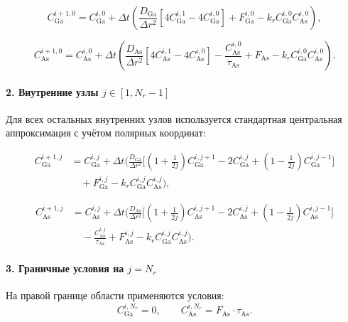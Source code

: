 \documentclass[14pt,oneside]{extarticle}
\begin{document}
\[
C_{\text{Ga}}^{i+1,0} = C_{\text{Ga}}^{i,0}
+ \Delta t \left(
\frac{D_{\text{Ga}}}{\Delta r^2} [4 C_{\text{Ga}}^{i,1} - 4 C_{\text{Ga}}^{i,0}]
+ F_{\text{Ga}}^{i,0}
- k_r C_{\text{Ga}}^{i,0} C_{\text{As}}^{i,0}
\right),
\]

\[
C_{\text{As}}^{i+1,0} = C_{\text{As}}^{i,0}
+ \Delta t \left(
\frac{D_{\text{As}}}{\Delta r^2} [4 C_{\text{As}}^{i,1} - 4 C_{\text{As}}^{i,0}]
- \frac{C_{\text{As}}^{i,0}}{\tau_{\text{As}}}
+ F_{\text{As}} - k_r C_{\text{Ga}}^{i,0} C_{\text{As}}^{i,0}
\right).
\]

\paragraph{2. Внутренние узлы \( j \in [1, N_r-1] \)}

Для всех остальных внутренних узлов используется стандартная центральная аппроксимация с учётом полярных координат:

\begin{align*}
    C_{\text{Ga}}^{i+1,j} &= C_{\text{Ga}}^{i,j}
    + \Delta t \Bigg(
      \frac{D_{\text{Ga}}}{\Delta r^2}
      \bigg[
        \left(1 + \frac{1}{2j} \right) C_{\text{Ga}}^{i,j+1}
        - 2 C_{\text{Ga}}^{i,j}
        + \left(1 - \frac{1}{2j} \right) C_{\text{Ga}}^{i,j-1}
      \bigg] \\
    &\quad + F_{\text{Ga}}^{i,j}
    - k_r C_{\text{Ga}}^{i,j} C_{\text{As}}^{i,j}
    \Bigg),
    \end{align*}
    
    \begin{align*}
    C_{\text{As}}^{i+1,j} &= C_{\text{As}}^{i,j}
    + \Delta t \Bigg(
      \frac{D_{\text{As}}}{\Delta r^2}
      \bigg[
        \left(1 + \frac{1}{2j} \right) C_{\text{As}}^{i,j+1}
        - 2 C_{\text{As}}^{i,j}
        + \left(1 - \frac{1}{2j} \right) C_{\text{As}}^{i,j-1}
      \bigg] \\
    &\quad - \frac{C_{\text{As}}^{i,j}}{\tau_{\text{As}}}
    + F_{\text{As}}^{i,j}
    - k_r C_{\text{Ga}}^{i,j} C_{\text{As}}^{i,j}
    \Bigg).
\end{align*}
    

\paragraph{3. Граничные условия на \( j = N_r \)}

На правой границе области применяются условия:
\[
C_{\text{Ga}}^{i,N_r} = 0, \qquad C_{\text{As}}^{i,N_r} = F_{\text{As}} \cdot \tau_{\text{As}}.
\]
\end{document}
